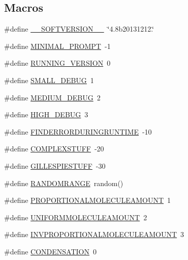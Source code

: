 \subsection*{Macros}
\begin{DoxyCompactItemize}
\item 
\#define \hyperlink{a00072_aab38659c2fe462437b89a1e85e619dc7}{\-\_\-\-\_\-\-S\-O\-F\-T\-V\-E\-R\-S\-I\-O\-N\-\_\-\-\_\-}~\char`\"{}4.\-8b20131212.\char`\"{}
\item 
\#define \hyperlink{a00072_a972f6696f10f8159f336357f003493b6}{M\-I\-N\-I\-M\-A\-L\-\_\-\-P\-R\-O\-M\-P\-T}~-\/1
\item 
\#define \hyperlink{a00072_a72244054b9e2e45fe85cbef84bd42904}{R\-U\-N\-N\-I\-N\-G\-\_\-\-V\-E\-R\-S\-I\-O\-N}~0
\item 
\#define \hyperlink{a00072_a6f7711b8195edb3c3541c153ebcb4bfa}{S\-M\-A\-L\-L\-\_\-\-D\-E\-B\-U\-G}~1
\item 
\#define \hyperlink{a00072_ab0ead5a0a8c59ad5f4d9fcf0be28a5d7}{M\-E\-D\-I\-U\-M\-\_\-\-D\-E\-B\-U\-G}~2
\item 
\#define \hyperlink{a00072_ac2a71f467524d5299cbff5df96be638a}{H\-I\-G\-H\-\_\-\-D\-E\-B\-U\-G}~3
\item 
\#define \hyperlink{a00072_a0934dca9b46dc1ce8ccae606a6511f63}{F\-I\-N\-D\-E\-R\-R\-O\-R\-D\-U\-R\-I\-N\-G\-R\-U\-N\-T\-I\-M\-E}~-\/10
\item 
\#define \hyperlink{a00072_a186bfb39322832c790ce5403bc04330d}{C\-O\-M\-P\-L\-E\-X\-S\-T\-U\-F\-F}~-\/20
\item 
\#define \hyperlink{a00072_a27f5d30679c0e8877ba9246eb1a48ff4}{G\-I\-L\-L\-E\-S\-P\-I\-E\-S\-T\-U\-F\-F}~-\/30
\item 
\#define \hyperlink{a00072_a4cb4f6978b0d938a0523bd6946e7609d}{R\-A\-N\-D\-O\-M\-R\-A\-N\-G\-E}~random()
\item 
\#define \hyperlink{a00072_a79c4b6317fd327fd5a62d65036481a25}{P\-R\-O\-P\-O\-R\-T\-I\-O\-N\-A\-L\-M\-O\-L\-E\-C\-U\-L\-E\-A\-M\-O\-U\-N\-T}~1
\item 
\#define \hyperlink{a00072_a6236cb136896f6bcbc6694d394e8aca3}{U\-N\-I\-F\-O\-R\-M\-M\-O\-L\-E\-C\-U\-L\-E\-A\-M\-O\-U\-N\-T}~2
\item 
\#define \hyperlink{a00072_ae36555e0be87892071c6340cc0fa43ad}{I\-N\-V\-P\-R\-O\-P\-O\-R\-T\-I\-O\-N\-A\-L\-M\-O\-L\-E\-C\-U\-L\-E\-A\-M\-O\-U\-N\-T}~3
\item 
\#define \hyperlink{a00072_aeeaf3e004dff03f70f94e0cf7d623b3c}{C\-O\-N\-D\-E\-N\-S\-A\-T\-I\-O\-N}~0
\item 

\end{DoxyCompactItemize}
